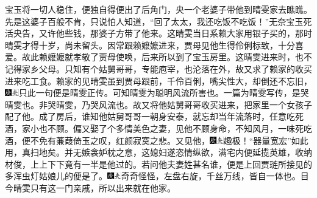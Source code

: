宝玉将一切人稳住，便独自得便出了后角门，央一个老婆子带他到晴雯家去瞧瞧。先是这婆子百般不肯，只说怕人知道，``回了太太，我还吃饭不吃饭！''无奈宝玉死活央告，又许他些钱，那婆子方带了他来。这晴雯当日系赖大家用银子买的，那时晴雯才得十岁，尚未留头。因常跟赖嬷嬷进来，贾母见他生得伶俐标致，十分喜爱。故此赖嬷嬷就孝敬了贾母使唤，后来所以到了宝玉房里。这晴雯进来时，也不记得家乡父母。只知有个姑舅哥哥，专能庖宰，也沦落在外，故又求了赖家的收买进来吃工食。赖家的见晴雯虽到贾母跟前，千伶百俐，嘴尖性大，却倒还不忘旧，{\includegraphics[width=3mm]{../Images/00004}\includegraphics[width=3mm]{../Images/00012}\footnotesize \kaishu 只此一句便是晴雯正传。可知晴雯为聪明风流所害也。一篇为晴雯写传，是哭晴雯也。非哭晴雯，乃哭风流也。}故又将他姑舅哥哥收买进来，把家里一个女孩子配了他。成了房后，谁知他姑舅哥哥一朝身安泰，就忘却当年流落时，任意吃死酒，家小也不顾。偏又娶了个多情美色之妻，见他不顾身命，不知风月，一味死吃酒，便不免有蒹葭倚玉之叹，红颜寂寞之悲。又见他，{\includegraphics[width=3mm]{../Images/00004}\includegraphics[width=3mm]{../Images/00012}\footnotesize \kaishu 趣极！``器量宽宏''如此用，真扫地矣。}并无嫉衾妒枕之意，这媳妇遂恣情纵欲，满宅内便延揽英雄，收纳材俊，上上下下竟有一半是他过的。若问他夫妻姓甚名谁，便是上回贾琏所接见的多浑虫灯姑娘儿的便是了。{\includegraphics[width=3mm]{../Images/00004}\includegraphics[width=3mm]{../Images/00012}\footnotesize \kaishu 奇奇怪怪，左盘右旋，千丝万线，皆自一体也。}目今晴雯只有这一门亲戚，所以出来就在他家。

